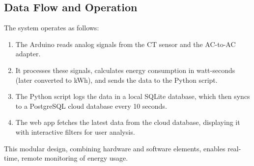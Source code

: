 \subsection{Data Flow and Operation}

\noindent The system operates as follows:
\begin{enumerate}
    \item The Arduino reads analog signals from the CT sensor and the AC-to-AC adapter.
    \item It processes these signals, calculates energy consumption in watt-seconds (later converted to kWh), and sends the data to the Python script.
    \item The Python script logs the data in a local SQLite database, which then syncs to a PostgreSQL cloud database every 10 seconds.
    \item The web app fetches the latest data from the cloud database, displaying it with interactive filters for user analysis.
\end{enumerate}

\noindent This modular design, combining hardware and software elements, enables real-time, remote monitoring of energy usage.
